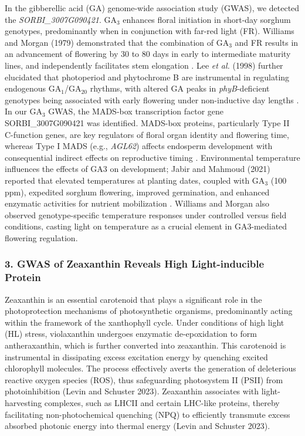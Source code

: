 \documentclass[10pt,letterpaper]{article}
\begin{document}
\begin{itemize}
In the gibberellic acid (GA) genome-wide association study (GWAS), we detected the \textit{SORBI\_3007G090421}. GA\(_3\) enhances floral initiation in short-day sorghum genotypes, predominantly when in conjunction with far-red light (FR). Williams and Morgan (1979) demonstrated that the combination of GA\(_3\) and FR results in an advancement of flowering by 30 to 80 days in early to intermediate maturity lines, and independently facilitates stem elongation \citep{Williams1979}. Lee \emph{et al.} (1998) further elucidated that photoperiod and phytochrome B are instrumental in regulating endogenous GA\(_1\)/GA\(_{20}\) rhythms, with altered GA peaks in \emph{phyB}-deficient genotypes being associated with early flowering under non-inductive day lengths \citep{Lee1998}. In our GA\(_3\) GWAS, the MADS-box transcription factor gene SORBI\_3007G090421 was identified. MADS-box proteins, particularly Type II C-function genes, are key regulators of floral organ identity and flowering time, whereas Type I MADS (e.g., \emph{AGL62}) affects endosperm development with consequential indirect effects on reproductive timing \citep{Paul2020}. Environmental temperature influences the effects of GA3 on development; Jabir and Mahmoud (2021) reported that elevated temperatures at planting dates, coupled with GA\(_3\) (100 ppm), expedited sorghum flowering, improved germination, and enhanced enzymatic activities for nutrient mobilization \citep{Jabir2021}. Williams and Morgan also observed genotype-specific temperature responses under controlled versus field conditions, casting light on temperature as a crucial element in GA3-mediated flowering regulation.


\subsubsection*{3. GWAS of Zeaxanthin Reveals High Light-inducible Protein}

Zeaxanthin is an essential carotenoid that plays a significant role in the photoprotection mechanisms of photosynthetic organisms, predominantly acting within the framework of the xanthophyll cycle. Under conditions of high light (HL) stress, violaxanthin undergoes enzymatic de-epoxidation to form antheraxanthin, which is further converted into zeaxanthin. This carotenoid is instrumental in dissipating excess excitation energy by quenching excited chlorophyll molecules. The process effectively averts the generation of deleterious reactive oxygen species (ROS), thus safeguarding photosystem II (PSII) from photoinhibition (Levin and Schuster 2023). Zeaxanthin associates with light-harvesting complexes, such as LHCII and certain LHC-like proteins, thereby facilitating non-photochemical quenching (NPQ) to efficiently transmute excess absorbed photonic energy into thermal energy (Levin and Schuster 2023).


\end{itemize}
\end{document}
